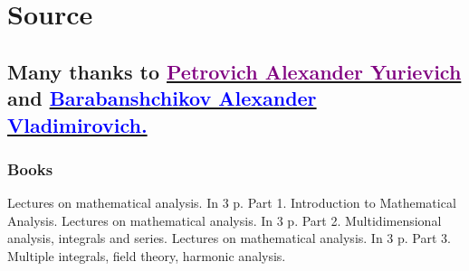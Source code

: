\documentclass{article}
\begin{document}
\section*{\centering Source}\subsection*{Many thanks to \href{https://clck.ru/eow9c}{\textcolor{purple}{Petrovich Alexander Yurievich}} and \href{https://clck.ru/eow9n}{\textcolor{blue}{Barabanshchikov Alexander Vladimirovich.}}}\subsubsection*{\centering Books} \newline
 \newline
Lectures on mathematical analysis. In 3 p. Part 1. Introduction to Mathematical Analysis. \newline
Lectures on mathematical analysis. In 3 p. Part 2. Multidimensional analysis, integrals and series. \newline
Lectures on mathematical analysis. In 3 p. Part 3. Multiple integrals, field theory, harmonic analysis. \newline
\end{document}
